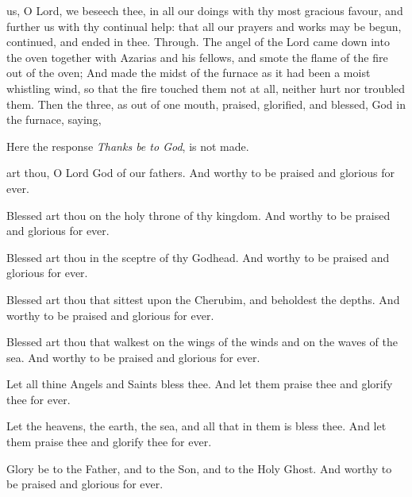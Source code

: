 \collect
{} us, O Lord, we beseech thee, in all our doings with thy most gracious favour, and further us with thy continual help: that all our prayers and works may be begun, continued, and ended in thee. Through.
 The angel of the Lord came down into the oven together with Azarias and his fellows, and smote the flame of the fire out of the oven; And made the midst of the furnace as it had been a moist whistling wind, so that the fire touched them not at all, neither hurt nor troubled them. Then the three, as out of one mouth, praised, glorified, and blessed, God in the furnace, saying,
\begin{rubric}
    Here the response \emph{Thanks be to God}, is not made.
\end{rubric}
 art thou, O Lord God of our fathers. And worthy to be praised and glorious for ever.\par
{}

Blessed art thou on the holy throne of thy kingdom. And worthy to be praised and glorious for ever.

Blessed art thou in the sceptre of thy Godhead. And worthy to be praised and glorious for ever.

Blessed art thou that sittest upon the Cherubim, and beholdest the depths. And worthy to be praised and glorious for ever.

Blessed art thou that walkest on the wings of the winds and on the waves of the sea. And worthy to be praised and glorious for ever.

Let all thine Angels and Saints bless thee. And let them praise thee and glorify thee for ever.

Let the heavens, the earth, the sea, and all that in them is bless thee. And let them praise thee and glorify thee for ever.

Glory be to the Father, and to the Son, and to the Holy Ghost. And worthy to be praised and glorious for ever.

